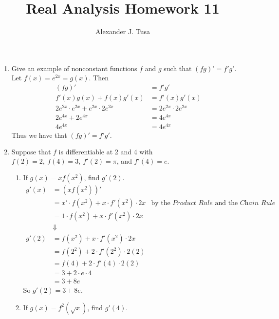 \documentclass[12pt,letterpaper]{article}
\author{Alexander J. Tusa}
\title{Real Analysis Homework 11}
\theoremstyle{case}
\theoremstyle{definition}
\begin{document}
	\maketitle
	\begin{enumerate}
		\item Give an example of nonconstant functions $f$ and $g$ such that $(fg)'=f'g'$.\\
		
		Let $f(x)=e^{2x}=g(x)$. Then
		\begin{align*}
			(fg)'&=f'g' \\
			f'(x)g(x)+f(x)g'(x) &= f'(x)g'(x) \\
			2e^{2x} \cdot e^{2x} + e^{2x} \cdot 2e^{2x} &= 2e^{2x} \cdot 2e^{2x} \\
			2e^{4x}+2e^{4x} &= 4e^{4x} \\
			4e^{4x} &= 4e^{4x}
		\end{align*}
		Thus we have that $(fg)'=f'g'$.\\
		\item Suppose that $f$ is differentiable at 2 and 4 with $f(2)=2,\ f(4)=3,\ f'(2)=\pi$, and $f'(4)=e$.
		\begin{enumerate}
			\item If $g(x)=xf(x^2)$, find $g'(2)$.\\
			
			\begin{align*}
				g'(x) &= (xf(x^2))' \\
				&= x' \cdot f(x^2)+x \cdot f'(x^2) \cdot 2x &\text{by the } \textit{Product Rule} \text{ and the } \textit{Chain Rule} \\
				&= 1 \cdot f(x^2) + x \cdot f'(x^2) \cdot 2x \\
				&\Downarrow \\
				g'(2) &= f(x^2) + x \cdot f'(x^2) \cdot 2x \\
				&= f(2^2) + 2 \cdot f'(2^2) \cdot 2(2)\\
				&= f(4)+2 \cdot f'(4) \cdot 2(2) \\
				&= 3+2 \cdot e \cdot 4 \\
				&= 3+8e
			\end{align*}
			So $g'(2) = 3+8e$.\\
			\item If $g(x)=f^2(\sqrt{x})$, find $g'(4)$.\\
			

\end{enumerate}
\end{enumerate}
\end{document}
